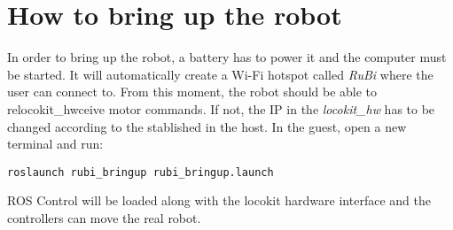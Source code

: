 \section{How to bring up the robot} %
\label{sec:how_to_bring_up_the_robot}
In order to bring up the robot, a battery has to power it and the computer must be started.
It will automatically create a Wi-Fi hotspot called \textit{RuBi} where the user can connect to.
From this moment, the robot should be able to relocokit_hwceive motor commands.
If not, the IP in the \textit{locokit\_hw} has to be changed according to the stablished in the host.
In the guest, open a new terminal and run:

\begin{lstlisting}
roslaunch rubi_bringup rubi_bringup.launch
\end{lstlisting}

ROS Control will be loaded along with the locokit hardware interface and the controllers can move the real robot.

